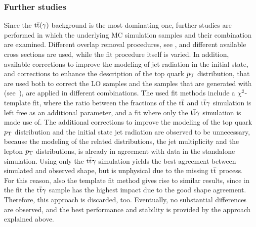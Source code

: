 \subsubsection*{Further studies}
Since the ${\mathrm{t}\overline{\mathrm{t}}}(\gamma)$ background is the most dominating one, further studies are performed in which the underlying MC simulation samples and their combination are examined. Different overlap removal procedures, see , and different available cross sections are used, while the fit procedure itself is varied. In addition, available corrections to improve the modeling of jet radiation in the initial state, and corrections to enhance the description of the top quark $p_{\mathrm{T}}$ distribution, that are used both to correct the LO samples and the samples that are generated with \POWHEG (see~), are applied in different combinations. The used fit methods include a $\chi^2$-template fit, where the ratio between the fractions of the ${\mathrm{t}\overline{\mathrm{t}}}$ and ${\mathrm{t}\overline{\mathrm{t}}}\gamma$ simulation is left free as an additional parameter, and a fit where only the ${\mathrm{t}\overline{\mathrm{t}}}\gamma$ simulation is made use of. The additional corrections to improve the modeling of the top quark $p_{\mathrm{T}}$ distribution and the initial state jet radiation are observed to be unnecessary, because the modeling of the related distributions, \ie the jet multiplicity and the lepton $p_{\mathrm{T}}$ distributions, is already in agreement with data in the standalone simulation. Using only the ${\mathrm{t}\overline{\mathrm{t}}}\gamma$ simulation yields the best agreement between simulated and observed shape, but is unphysical due to the missing ${\mathrm{t}\overline{\mathrm{t}}}$ process. For this reason, also the template fit method gives rise to similar results, since in the fit the ${\mathrm{t}\overline{\mathrm{t}}}\gamma$ sample has the highest impact due to the good shape agreement. Therefore, this approach is discarded, too. Eventually, no substantial differences are observed, and the best performance and stability is provided by the approach explained above.

